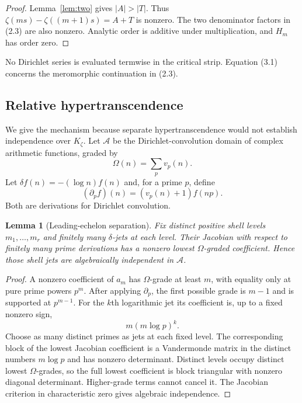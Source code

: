 \documentclass[11pt]{article}
\newtheorem{lemma}[theorem]{Lemma}
\theoremstyle{definition}
\theoremstyle{remark}
\begin{document}
\begin{proof}
Lemma~\ref{lem:two} gives $|A|>|T|$.  Thus
$\zeta(ms)-\zeta((m+1)s)=A+T$ is nonzero.  The two denominator factors in (2.3) are also nonzero.
Analytic order is additive under multiplication, and $H_m$ has order zero.
\end{proof}

No Dirichlet series is evaluated termwise in the critical strip.  Equation (3.1) concerns the
meromorphic continuation in (2.3).

\subsection{Relative hypertranscendence}

We give the mechanism because separate hypertranscendence would not establish independence over
$K_\zeta$.  Let $\mathcal A$ be the Dirichlet-convolution domain of complex arithmetic functions,
graded by
\[
 \Omega(n)=\sum_pv_p(n).
\]
Let $\delta f(n)=-(\log n)f(n)$ and, for a prime $p$, define
\[
 (\partial_pf)(n)=(v_p(n)+1)f(np).
\]
Both are derivations for Dirichlet convolution.

\begin{lemma}[Leading-echelon separation]\label{lem:echelon}
Fix distinct positive shell levels $m_1,\ldots,m_r$ and finitely many $\delta$-jets at each
level.  Their Jacobian with respect to finitely many prime derivations has a nonzero lowest
$\Omega$-graded coefficient.  Hence those shell jets are algebraically independent in
$\mathcal A$.
\end{lemma}

\begin{proof}
A nonzero coefficient of $a_m$ has $\Omega$-grade at least $m$, with equality only at pure prime
powers $p^m$.  After applying $\partial_p$, the first possible grade is $m-1$ and is supported at
$p^{m-1}$.  For the $k$th logarithmic jet its coefficient is, up to a fixed nonzero sign,
\[
 m(m\log p)^k.
 \tag{3.2}
\]
Choose as many distinct primes as jets at each fixed level.  The corresponding block of the
lowest Jacobian coefficient is a Vandermonde matrix in the distinct numbers $m\log p$ and has
nonzero determinant.  Distinct levels occupy distinct lowest $\Omega$-grades, so the full lowest
coefficient is block triangular with nonzero diagonal determinant.  Higher-grade terms cannot
cancel it.  The Jacobian criterion in characteristic zero gives algebraic independence.
\end{proof}
\end{document}
